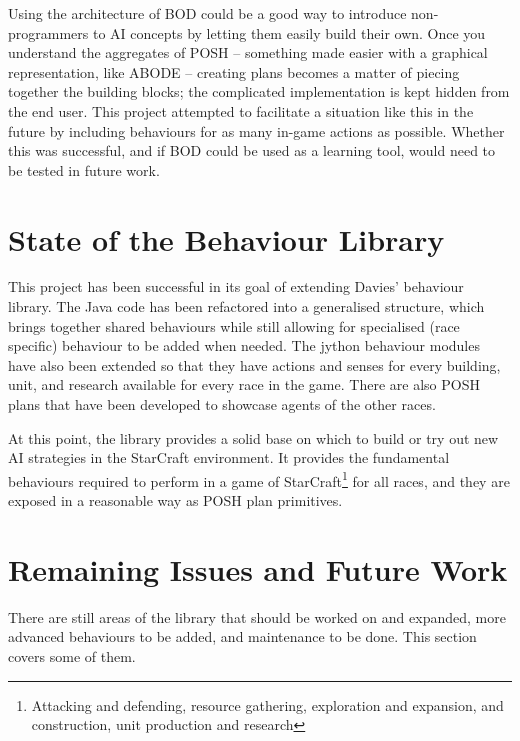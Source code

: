 \documentclass[11pt,openright,a4paper]{report}
\begin{document}
Using the architecture of BOD could be a good way to introduce non-programmers to AI concepts by letting them easily build their own. Once you understand the aggregates of POSH -- something made easier with a graphical representation, like ABODE -- creating plans becomes a matter of piecing together the building blocks; the complicated implementation is kept hidden from the end user. This project attempted to facilitate a situation like this in the future by including behaviours for as many in-game actions as possible. Whether this was successful, and if BOD could be used as a learning tool, would need to be tested in future work.

\section{State of the Behaviour Library}
This project has been successful in its goal of extending Davies' behaviour library. The Java code has been refactored into a generalised structure, which brings together shared behaviours while still allowing for specialised (race specific) behaviour to be added when needed. The jython behaviour modules have also been extended so that they have actions and senses for every building, unit, and research available for every race in the game. There are also POSH plans that have been developed to showcase agents of the other races.

At this point, the library provides a solid base on which to build or try out new AI strategies in the StarCraft environment. It provides the fundamental behaviours required to perform in a game of StarCraft\footnote{Attacking and defending, resource gathering, exploration and expansion, and construction, unit production and research} for all races, and they are exposed in a reasonable way as POSH plan primitives. 

\section{Remaining Issues and Future Work}
There are still areas of the library that should be worked on and expanded, more advanced behaviours to be added, and maintenance to be done. This section covers some of them.
\end{document}
